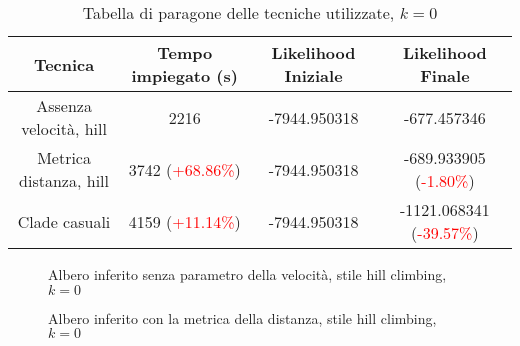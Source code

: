 \begin{table}[H]
    \centering
    \begin{tabular}{c | c | c | c }
        Tecnica & Tempo impiegato (s) & Likelihood Iniziale & Likelihood Finale \\ \midrule \midrule 
        Assenza velocità, hill & 2216 & -7944.950318 & -677.457346 \\
        Metrica distanza, hill & 3742 (\textcolor{red}{+68.86\%}) & -7944.950318 & -689.933905 (\textcolor{red}{-1.80\%}) \\
        Clade casuali & 4159 (\textcolor{red}{+11.14\%}) & -7944.950318 & -1121.068341 (\textcolor{red}{-39.57\%})
    \end{tabular}
    \caption{Tabella di paragone delle tecniche utilizzate, $k = 0$}
    \label{tab:results-table-dollo-0}
\end{table}

\begin{figure}[!h]
    \centering
    \caption{Albero inferito senza parametro della velocità, stile hill climbing, $k = 0$}
    \label{fig:results-tree-dollo-0-1}
\end{figure}

\begin{figure}[!h]
    \centering
    \caption{Albero inferito con la metrica della distanza, stile hill climbing, $k = 0$}
    \label{fig:results-tree-dollo-0-2}
\end{figure}

